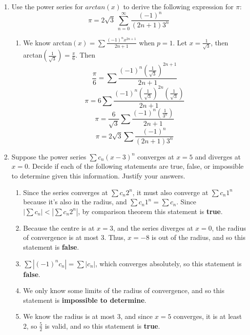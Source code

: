 \documentclass[12pt]{article}
\begin{document}
\begin{enumerate}
\begin{enumerate}
\end{enumerate}

\newpage

\item Use the power series for $arctan(x)$ to derive the following expression for $\pi$: $$\pi=2\sqrt{3}\ \displaystyle{\sum_{n=0}^\infty \dfrac{(-1)^n}{(2n+1)3^n}}$$
\begin{enumerate}
    \item We know arctan$(x)=\sum\frac{(-1)^nx^{2n+1}}{2n+1}$ when $p = 1$. Let $x = \frac{1}{\sqrt{3}}$, then arctan$\left(\frac{1}{\sqrt{3}}\right)=\frac{\pi}{6}$. Then $$\frac{\pi}{6}=\sum\frac{(-1)^n\left(\frac{1}{\sqrt{3}}\right)^{2n+1}}{2n+1}$$ $$\pi = 6\sum\frac{(-1)^n\left(\frac{1}{\sqrt{3}}\right)^{2n}\left(\frac{1}{\sqrt{3}}\right)}{2n+1}$$ $$\pi = \frac{6}{\sqrt{3}}\sum\frac{(-1)^n\left(\frac{1}{3^n}\right)}{2n+1}$$ $$\pi = 2\sqrt{3}\sum\frac{(-1)^n}{(2n+1)3^n}$$
\end{enumerate}

\pagebreak

\item Suppose the power series $\sum c_n(x-3)^n$ converges at $x=5$ and diverges at $x=0$.  Decide if each of the following statements are true, false, or impossible to determine given this information.  Justify your answers.

\begin{enumerate}
\item Since the series converges at $\sum c_n2^n$, it must also converge at $\sum c_n1^n$ because it's also in the radius, and $\sum c_n1^n = \sum c_n$. Since $|\sum c_n| < |\sum c_n2^n|$, by comparison theorem this statement is \textbf{true}.
\\
\item Because the centre is at $x=3$, and the series diverges at $x=0$, the radius of convergence is at most 3. Thus, $x=-8$ is out of the radius, and so this statement is \textbf{false}. 
\\
\item $\sum |(-1)^nc_n| = \sum |c_n|$, which converges absolutely, so this statement is \textbf{false}.
\\
\item We only know some limits of the radius of convergence, and so this statement is \textbf{impossible to determine}.
\\
\item We know the radius is at most 3, and since $x=5$ converges, it is at least 2, so $\frac{5}{2}$ is valid, and so this statement is \textbf{true}.
\end{enumerate}



\end{enumerate}
\end{document}
